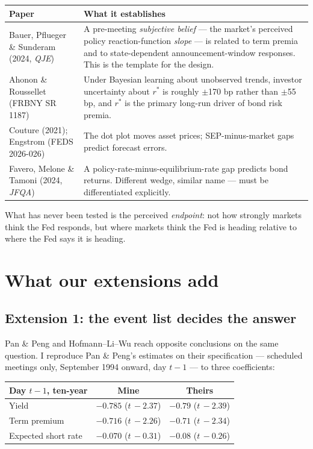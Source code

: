 \documentclass[11pt]{article}
\newcommand{\rs}{$r^{*}$}
\begin{document}
\noindent
\begin{tabular}{@{}p{}p{}@{}}
\toprule
\textbf{Paper} & \textbf{What it establishes}\\ \midrule
Bauer, Pflueger \& Sunderam (2024, \emph{QJE}) & A pre-meeting \emph{subjective belief} --- the
market's perceived policy reaction-function \emph{slope} --- is related to term premia and to
state-dependent announcement-window responses. This is the template for the design.\\[0.35em]
Ahonon \& Roussellet (FRBNY SR 1187) & Under Bayesian learning about unobserved trends,
investor uncertainty about \rs{} is roughly $\pm$170 bp rather than $\pm$55 bp, and \rs{} is
the primary long-run driver of bond risk premia.\\[0.35em]
Couture (2021); Engstrom (FEDS 2026-026) & The dot plot moves asset prices; SEP-minus-market
gaps predict forecast errors.\\[0.35em]
Favero, Melone \& Tamoni (2024, \emph{JFQA}) & A policy-rate-minus-equilibrium-rate gap predicts
bond returns. Different wedge, similar name --- must be differentiated explicitly.\\
\bottomrule
\end{tabular}

\vspace{0.5em}
\noindent What has never been tested is the perceived \emph{endpoint}: not how strongly markets
think the Fed responds, but where markets think the Fed is heading relative to where the Fed
says it is heading.

\section{What our extensions add}

\subsection{Extension 1: the event list decides the answer}

Pan \& Peng and Hofmann--Li--Wu reach opposite conclusions on the same question. I reproduce
Pan \& Peng's estimates on their specification --- scheduled meetings only, September 1994
onward, day $t-1$ --- to three coefficients:

\begin{center}\small
\begin{tabular}{lcc}
\toprule
Day $t-1$, ten-year & Mine & Theirs\\ \midrule
Yield & $-0.785$ ($t\,{-}2.37$) & $-0.79$ ($t\,{-}2.39$)\\
Term premium & $-0.716$ ($t\,{-}2.26$) & $-0.71$ ($t\,{-}2.34$)\\
Expected short rate & $-0.070$ ($t\,{-}0.31$) & $-0.08$ ($t\,{-}0.26$)\\
\bottomrule\end{tabular}
\end{center}
\end{document}
